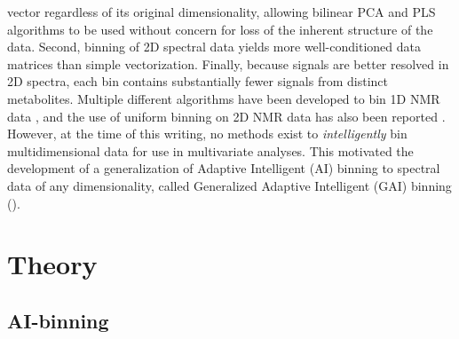 \begin{doublespace}
vector regardless of its original dimensionality, allowing bilinear PCA and
PLS algorithms to be used without concern for loss of the inherent structure
of the data. Second, binning of 2D spectral data yields more well-conditioned
data matrices than simple vectorization. Finally, because signals are better
resolved in 2D spectra, each bin contains substantially fewer signals from
distinct metabolites. Multiple different algorithms have been developed to
bin 1D NMR data \cite{
  anderson:metab2008,
  anderson:metab2011,
  davis:cils2007,
  demeyer:anchem2008,
  sousa:cils2013}, and the use of uniform binning on 2D NMR data has also been
reported \cite{van:jpr2008}. However, at the time of this writing, no methods
exist to \emph{intelligently} bin multidimensional data for use in multivariate
analyses. This motivated the development of a generalization of Adaptive
Intelligent (AI) binning \cite{demeyer:anchem2008} to spectral data
of any dimensionality, called Generalized Adaptive Intelligent (GAI) binning
().
\end{doublespace}

\section{Theory}

\subsection{AI-binning}

